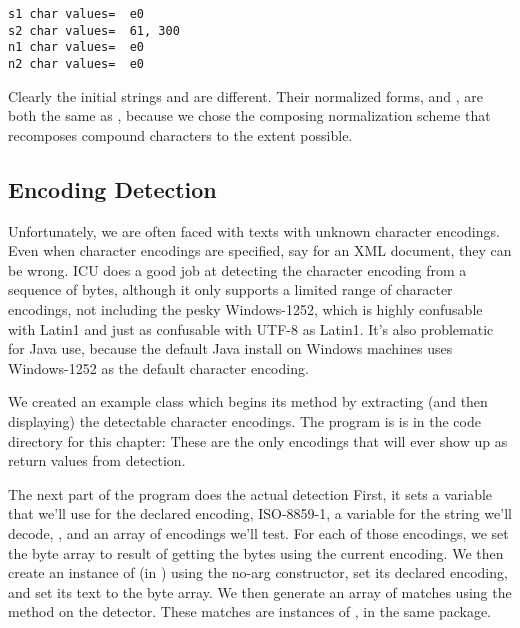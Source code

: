 \begin{verbatim}
s1 char values=  e0
s2 char values=  61, 300
n1 char values=  e0
n2 char values=  e0
\end{verbatim}
%
Clearly the initial strings  and  are different.
Their normalized forms,  and , are both the same as
, because we chose the composing normalization scheme that
recomposes compound characters to the extent possible.


\subsection{Encoding Detection}\label{section:encoding-detection}

Unfortunately, we are often faced with texts with unknown character
encodings.  Even when character encodings are specified, say for an
XML document, they can be wrong.  ICU does a good job at detecting the
character encoding from a sequence of bytes, although it only supports
a limited range of character encodings, not including the pesky
Windows-1252, which is highly confusable with Latin1 and just as
confusable with UTF-8 as Latin1.  It's also problematic for Java use,
because the default Java install on Windows machines uses Windows-1252 as
the default character encoding.

We created an example class  which begins its
 method by extracting (and then displaying) the detectable
character encodings.
The program is is in the code directory for this chapter:
%
%
%
These are the only encodings that will ever show up as return values
from detection.  

The next part of the program does the actual detection
%
%
First, it sets a variable that we'll use for the declared encoding,
ISO-8859-1, a variable for the string we'll decode,
, and an array of encodings we'll test.
For each of those encodings, we set the byte array  to result
of getting the bytes using the current encoding.  We then create an
instance of  (in ) using
the no-arg constructor, set its declared encoding, and set its text to
the byte array.  We then generate an array of matches using the
 method on the detector.  These matches are instances
of , in the same package.  

